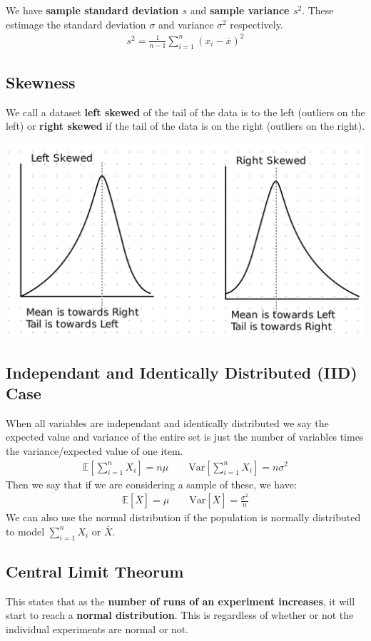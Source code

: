 \documentclass[12pt,letterpaper]{article} \usepackage{amsmath} \usepackage{graphicx} \usepackage[margin=1in]{geometry} \usepackage{longtable}  \usepackage{amssymb}
\begin{document}
	We have \textbf{sample standard deviation $s$} and \textbf{sample variance $s^2$}. These estimage the standard deviation $\sigma$ and variance $\sigma^2$ respectively. 
	\begin{align*}
		s^2 = \frac{1}{n-1}\sum^{n}_{i=1}(x_i - \overline x)^2
	\end{align*}

	\subsection{Skewness}
	We call a dataset \textbf{left skewed} of the tail of the data is to the left (outliers on the left) or \textbf{right skewed} if the tail of the data is on the right (outliers on the right).
	\begin{center}
		\includegraphics[width=0.6\linewidth]{skew}
	\end{center}

	\subsection{Independant and Identically Distributed (IID) Case}
	When all variables are independant and identically distributed we say the expected value and variance of the entire set is just the number of variables times the variance/expected value of one item.
	\begin{align*}
		\mathbb E\left[\sum_{i=1}^{n}X_i\right]=n\mu \qquad \text{Var}\left[\sum_{i=1}^{n}X_i\right]=n\sigma^2
	\end{align*}
	Then we say that if we are considering a sample of these, we have:
	\begin{align*}
		\mathbb E [\overline X] = \mu \qquad \text{Var} [\overline X] = \frac{\sigma^2}{n}
	\end{align*}
	We can also use the normal distribution if the population is normally distributed to model $\sum_{i=1}^n X_i$ or $\overline X$.
	
	\subsection{Central Limit Theorum}
	This states that as the \textbf{number of runs of an experiment increases}, it will start to reach a \textbf{normal distribution}. This is regardless of whether or not the individual experiments are normal or not. 
	
\end{document}
